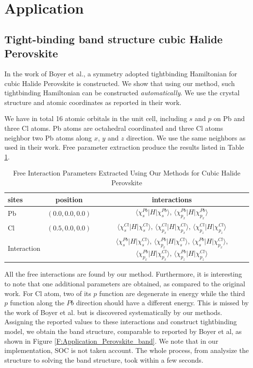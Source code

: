 \documentclass{article}
\begin{document}
\section{Application}
\subsection{Tight-binding band structure cubic Halide Perovskite}

In the work of Boyer et al.\cite{boyer-richard_symmetry-based_2016}, a symmetry adopted 
tightbinding Hamiltonian for cubic Halide Perovskite is constructed. We show that using our 
method, such tightbinding Hamiltonian can be constructed \emph{automatically}. We use the 
crystal structure and atomic coordinates as reported in their work. 

We have in total 16 atomic orbitals in the unit cell, including $s$ and $p$ on Pb and three Cl 
atoms. Pb atoms are octahedral coordinated and three Cl atoms neighbor two Pb atoms along $x$, $y$ 
and $z$ direction. We use the same neighbors as used in their work. Free parameter extraction 
produce the results listed in Table \ref{T:free_perovskite}.

\begin{table}[h!]
    \centering
    \caption{Free Interaction Parameters Extracted Using Our Methods for Cubic Halide Perovskite}
    \begin{tabular}{|l|c|c|}
        \hline
        sites & position & interactions \\
        \hline
        Pb & $(0.0,0.0,0.0)$ & $\langle \chi_s^{Pb} | H | \chi_s^{Pb} \rangle$, $\langle \chi_{p_x}^{Pb} | H | \chi_{p_x}^{Pb} \rangle$ \\
        \hline
        Cl & $(0.5,0.0,0.0)$ & $\langle \chi_s^{Cl} | H | \chi_s^{Cl} \rangle$, $\langle \chi_{p_x}^{Cl} | H | \chi_{p_x}^{Cl} \rangle $, $\langle \chi_{p_z}^{Cl} | H | \chi_{p_z}^{Cl} \rangle$ \\
        \hline
        Interaction & & $\langle \chi_s^{Pb} | H | \chi_s^{Cl} \rangle$, $\langle \chi_{p_x}^{Pb} | H | \chi_s^{Cl} \rangle$, $\langle \chi_s^{Pb} | H | \chi_{p_x}^{Cl} \rangle$, 
        $\langle \chi_{p_x}^{Pb} | H | \chi_{p_x}^{Cl} \rangle$, $\langle \chi_{p_z}^{Pb} | H | \chi_{p_z}^{Cl} \rangle$ \\
        \hline
    \end{tabular}
    \label{T:free_perovskite}
\end{table}

All the free interactions are found by our method. Furthermore, it is interesting to note that one additional parameters are obtained,
as compared to the original work. For Cl atom, two of its $p$ function are degenerate in energy while the third $p$ function along the 
$Pb$ direction should have a different energy. This is missed by the work of Boyer et al. but is discovered 
systematically by our methods.
Assigning the reported values to these interactions and construct tightbinding model, we obtain the band structure, comparable to reported 
by Boyer et al, as shown in Figure \ref{F:Application_Perovskite_band}. We note that in our implementation, SOC is not taken account. 
The whole process, from analysize the structure to solving the band structure, took within a few seconds.
\end{document}
